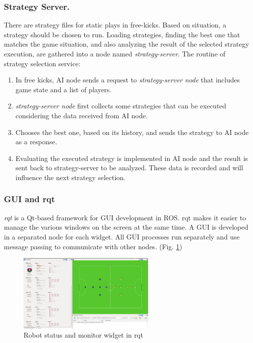 \documentclass{llncs}
\begin{document}
\subsubsection{Strategy Server.}
\label{subsubsec:StrategyServer}
There are strategy files for static plays in free-kicks\cite{p:15}. Based on situation, a strategy should be chosen to run. Loading strategies, finding the best one that matches the game situation, and also analyzing the result of the selected strategy execution, are gathered into a node named \textit{strategy-server}. The routine of strategy selection service:
\begin{enumerate}
	\item  In free kicks, AI node sends a request to \textit{strategy-server node} that includes game state and a list of players.
	\item  \textit{strategy-server node} first collects some strategies that can be executed considering the data received from AI node.
	\item Chooses the best one, based on its history, and sends the strategy to AI node as a response.
    \item Evaluating the executed strategy is implemented in AI node and the result is sent back to strategy-server to be analyzed. These data is recorded and will influence the next strategy selection.
\end{enumerate}

\subsubsection{GUI and rqt}

\textit{rqt} is a Qt-based framework for GUI development in ROS. rqt makes it easier to manage the various windows on the screen at the same time. A GUI is developed in a separated node for each widget. All GUI processes run separately and use message passing to communicate with other nodes. (Fig. \ref{fig:GUI1})
\begin{figure}
\centering
\includegraphics[width=0.60\textwidth]{img/gui1}
\centering
\caption{Robot status and monitor widget in rqt}
\label{fig:GUI1}
\end{figure}
\end{document}
